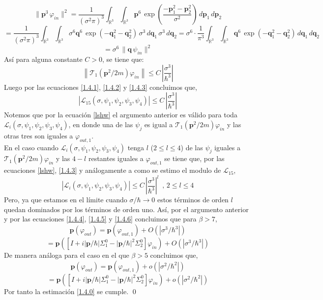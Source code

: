 \documentclass[12pt]{book}
\numberwithin{equation}{chapter}
\def\v{\mathbf}
\def\n{\noindent}
\def\R{\mathbb{R}}
\def\T{\mathcal{T}}
\def\L{\mathcal{L}}
\def\vp{\varphi}
\def\P{\mathbf{p}}
\begin{document}
$$ \| \P^{3}\, \vp_{in}  \|^{2} = \frac{1}{(\sigma^{2} \pi)^{3}} \int_{\R^{3}} \int_{\R^{3}} \P^{6}\, \exp \left( \frac{-\P_{1}^{2} -\P_{2}^{2} }{\sigma^{2}} \right) \, d\P_{1} \, d\P_{2} $$
$$ = \frac{1}{(\sigma^{2} \pi)^{3}} \int_{\R^{3}} \int_{\R^{3}} \sigma^{6} \v{q}^{6}\, \exp \left( -\v{q}_{1}^{2} -\v{q}_{2}^{2}  \right) \, \sigma^{3} \, d\v{q}_{1} \, \sigma^{3} \, d\v{q}_{2} = \sigma^{6} \cdot \frac{1}{\pi^{3}} \int_{\R^{3}} \int_{\R^{3}}  \v{q}^{6}\, \exp \left( -\v{q}_{1}^{2} -\v{q}_{2}^{2}  \right) \, d\v{q}_{1} \, d\v{q}_{2} $$
$$ = \sigma^{6}\, \|\v{q}\, \psi_{in}  \|^{2} $$
As\'i para alguna constante $C >0 $, se tiene que:
\begin{equation}\label{1.4.3}
\left\| \T_{1}(\P^{2}/2m)\vp_{in} \right\| \leq C \,\left|\frac{\sigma^{3}}{\hbar^{3}} \right|
\end{equation}
Luego por las ecuaciones \eqref{1.4.1}, \eqref{1.4.2} y \eqref{1.4.3} concluimos que,
\begin{equation}\label{1.4.6}
\left| \L_{15}(\sigma,\psi_{1},\psi_{2},\psi_{3},\psi_{4}) \right| \leq C \,\left|\frac{\sigma^{3}}{\hbar^{3}} \right|
\end{equation}
Notemos que por la ecuaci\'on \eqref{lshw} el argumento anterior es v\'alido para toda $  \L_{i}(\sigma,\psi_{1},\psi_{2},\psi_{3},\psi_{4}) $, en donde una de las $\psi_{j}$ es igual a $\T_{1}(\P^{2}/2m)\vp_{in}$ y las otras tres son iguales a $\vp_{out,1}$.\\

\n En el caso cuando $\L_{i}(\sigma,\psi_{1},\psi_{2},\psi_{3},\psi_{4})$ tenga $l$ ($2\leq l \leq 4$) de las $\psi_{j}$ iguales a $\T_{1}(\P^{2}/2m)\vp_{in}$ y las $4-l$ restantes iguales a $\vp_{out,1}$ se tiene que, por las ecuaciones \eqref{lshw}, \eqref{1.4.3} y an\'alogamente a como se estimo el modulo de $\L_{15}$,
$$ \left| \L_{i}(\sigma,\psi_{1},\psi_{2},\psi_{3},\psi_{4}) \right| \leq C \,\left|\frac{\sigma^{3}}{\hbar^{3}} \right|^{l} \,\,\,,\, 2 \leq l \leq 4 $$
Pero, ya que estamos en el l\'imite cuando $\sigma / \hbar \rightarrow 0$ estos t\'erminos de orden $l$ quedan dominados por los t\'erminos de orden uno. As\'i, por el argumento anterior y por las ecuaciones \eqref{1.4.4}, \eqref{1.4.5} y \eqref{1.4.6} concluimos que para $\beta > 7$,
$$ \P (\vp_{out})= \P(\vp_{out,1})+O(|\sigma^{3}/\hbar^{3}|) $$
$$ = \P \left( \left[I + i|\P/\hbar| \Sigma_{1}^{0} - |\P/\hbar|^{2} \Sigma_{2}^{0} \right] \vp_{in} \right) + O(|\sigma^{3}/\hbar^{3}|) $$
De manera an\'aloga para el caso en el que $\beta >5$ concluimos que,
$$ \P (\vp_{out})= \P(\vp_{out,1})+o(|\sigma^{2}/\hbar^{2}|) $$
$$ = \P \left( \left[I + i|\P/\hbar| \Sigma_{1}^{0} - |\P/\hbar|^{2} \Sigma_{2}^{0} \right] \vp_{in} \right) + o(|\sigma^{2}/\hbar^{2}|) $$
Por tanto la estimaci\'on \eqref{1.4.0} se cumple. 
\qed
\vspace{5 mm}
\end{document}
